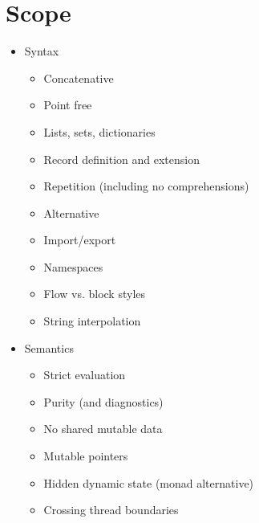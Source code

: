 \chapter{Scope}

\begin{itemize}

\item Syntax

  \begin{itemize}

  \item Concatenative

  \item Point free

  \item Lists, sets, dictionaries

  \item Record definition and extension

  \item Repetition (including no comprehensions)

  \item Alternative

  \item Import/export

  \item Namespaces

  \item Flow vs. block styles

  \item String interpolation

  \end{itemize}

\item Semantics

  \begin{itemize}

  \item Strict evaluation

  \item Purity (and diagnostics)

  \item No shared mutable data

  \item Mutable pointers

  \item Hidden dynamic state (monad alternative)

  \item Crossing thread boundaries

  \end{itemize}


\end{itemize}

